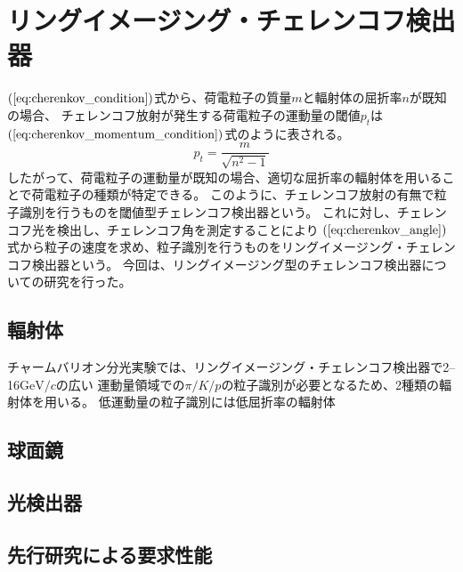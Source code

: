 \section{リングイメージング・チェレンコフ検出器}
$(\ref{eq:cherenkov_condition})$式から、荷電粒子の質量$m$と輻射体の屈折率$n$が既知の場合、
チェレンコフ放射が発生する荷電粒子の運動量の閾値$p_t$は$(\ref{eq:cherenkov_momentum_condition})$式のように表される。
\begin{equation}
  \label{eq:cherenkov_momentum_condition}
  p_t = \frac{m}{\sqrt{n^2-1}}
\end{equation}
したがって、荷電粒子の運動量が既知の場合、適切な屈折率の輻射体を用いることで荷電粒子の種類が特定できる。
このように、チェレンコフ放射の有無で粒子識別を行うものを閾値型チェレンコフ検出器という。
これに対し、チェレンコフ光を検出し、チェレンコフ角を測定することにより
$(\ref{eq:cherenkov_angle})$式から粒子の速度を求め、粒子識別を行うものをリングイメージング・チェレンコフ検出器という。
今回は、リングイメージング型のチェレンコフ検出器についての研究を行った。

\subsection{輻射体}
チャームバリオン分光実験では、リングイメージング・チェレンコフ検出器で2--16\space$\si{\GeV / c}$の広い
運動量領域での$\pi/K/p$の粒子識別が必要となるため、2種類の輻射体を用いる。
低運動量の粒子識別には低屈折率の輻射体


\subsection{球面鏡}

\subsection{光検出器}

\subsection{先行研究による要求性能}